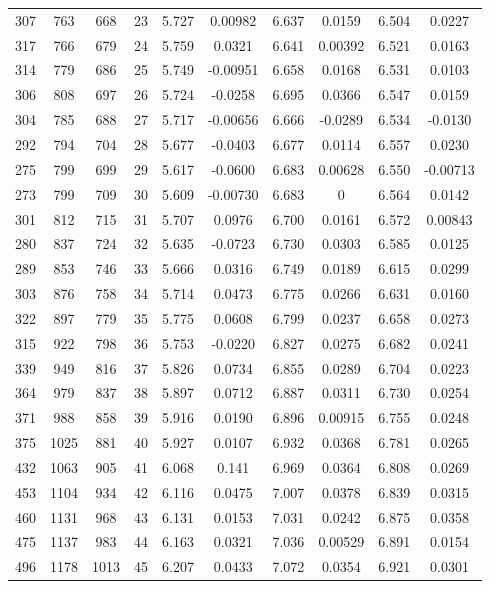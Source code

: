 \documentclass[]{article}
\begin{document}
\begin{tabular}{lccccccccc}
307 & 763 & 668 & 23 & 5.727 & 0.00982 & 6.637 & 0.0159 & 6.504 & 0.0227 \\
317 & 766 & 679 & 24 & 5.759 & 0.0321 & 6.641 & 0.00392 & 6.521 & 0.0163 \\
314 & 779 & 686 & 25 & 5.749 & -0.00951 & 6.658 & 0.0168 & 6.531 & 0.0103 \\
306 & 808 & 697 & 26 & 5.724 & -0.0258 & 6.695 & 0.0366 & 6.547 & 0.0159 \\
304 & 785 & 688 & 27 & 5.717 & -0.00656 & 6.666 & -0.0289 & 6.534 & -0.0130 \\
292 & 794 & 704 & 28 & 5.677 & -0.0403 & 6.677 & 0.0114 & 6.557 & 0.0230 \\
275 & 799 & 699 & 29 & 5.617 & -0.0600 & 6.683 & 0.00628 & 6.550 & -0.00713 \\
273 & 799 & 709 & 30 & 5.609 & -0.00730 & 6.683 & 0 & 6.564 & 0.0142 \\
301 & 812 & 715 & 31 & 5.707 & 0.0976 & 6.700 & 0.0161 & 6.572 & 0.00843 \\
280 & 837 & 724 & 32 & 5.635 & -0.0723 & 6.730 & 0.0303 & 6.585 & 0.0125 \\
289 & 853 & 746 & 33 & 5.666 & 0.0316 & 6.749 & 0.0189 & 6.615 & 0.0299 \\
303 & 876 & 758 & 34 & 5.714 & 0.0473 & 6.775 & 0.0266 & 6.631 & 0.0160 \\
322 & 897 & 779 & 35 & 5.775 & 0.0608 & 6.799 & 0.0237 & 6.658 & 0.0273 \\
315 & 922 & 798 & 36 & 5.753 & -0.0220 & 6.827 & 0.0275 & 6.682 & 0.0241 \\
339 & 949 & 816 & 37 & 5.826 & 0.0734 & 6.855 & 0.0289 & 6.704 & 0.0223 \\
364 & 979 & 837 & 38 & 5.897 & 0.0712 & 6.887 & 0.0311 & 6.730 & 0.0254 \\
371 & 988 & 858 & 39 & 5.916 & 0.0190 & 6.896 & 0.00915 & 6.755 & 0.0248 \\
375 & 1025 & 881 & 40 & 5.927 & 0.0107 & 6.932 & 0.0368 & 6.781 & 0.0265 \\
432 & 1063 & 905 & 41 & 6.068 & 0.141 & 6.969 & 0.0364 & 6.808 & 0.0269 \\
453 & 1104 & 934 & 42 & 6.116 & 0.0475 & 7.007 & 0.0378 & 6.839 & 0.0315 \\
460 & 1131 & 968 & 43 & 6.131 & 0.0153 & 7.031 & 0.0242 & 6.875 & 0.0358 \\
475 & 1137 & 983 & 44 & 6.163 & 0.0321 & 7.036 & 0.00529 & 6.891 & 0.0154 \\
496 & 1178 & 1013 & 45 & 6.207 & 0.0433 & 7.072 & 0.0354 & 6.921 & 0.0301 \\

\end{tabular}
\end{document}
